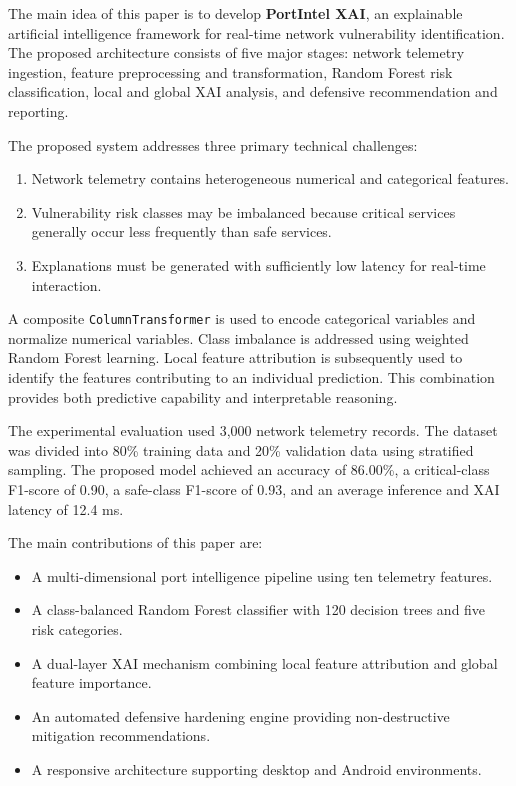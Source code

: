 \documentclass[conference]{IEEEtran}
\begin{document}
The main idea of this paper is to develop \textbf{PortIntel XAI}, an explainable artificial intelligence framework for real-time network vulnerability identification. The proposed architecture consists of five major stages: network telemetry ingestion, feature preprocessing and transformation, Random Forest risk classification, local and global XAI analysis, and defensive recommendation and reporting.

The proposed system addresses three primary technical challenges:
\begin{enumerate}
    \item Network telemetry contains heterogeneous numerical and categorical features.
    \item Vulnerability risk classes may be imbalanced because critical services generally occur less frequently than safe services.
    \item Explanations must be generated with sufficiently low latency for real-time interaction.
\end{enumerate}

A composite \texttt{ColumnTransformer} is used to encode categorical variables and normalize numerical variables. Class imbalance is addressed using weighted Random Forest learning. Local feature attribution is subsequently used to identify the features contributing to an individual prediction. This combination provides both predictive capability and interpretable reasoning.

The experimental evaluation used 3,000 network telemetry records. The dataset was divided into 80\% training data and 20\% validation data using stratified sampling. The proposed model achieved an accuracy of 86.00\%, a critical-class F1-score of 0.90, a safe-class F1-score of 0.93, and an average inference and XAI latency of 12.4 ms.

The main contributions of this paper are:
\begin{itemize}
    \item A multi-dimensional port intelligence pipeline using ten telemetry features.
    \item A class-balanced Random Forest classifier with 120 decision trees and five risk categories.
    \item A dual-layer XAI mechanism combining local feature attribution and global feature importance.
    \item An automated defensive hardening engine providing non-destructive mitigation recommendations.
    \item A responsive architecture supporting desktop and Android environments.
\end{itemize}
\end{document}
